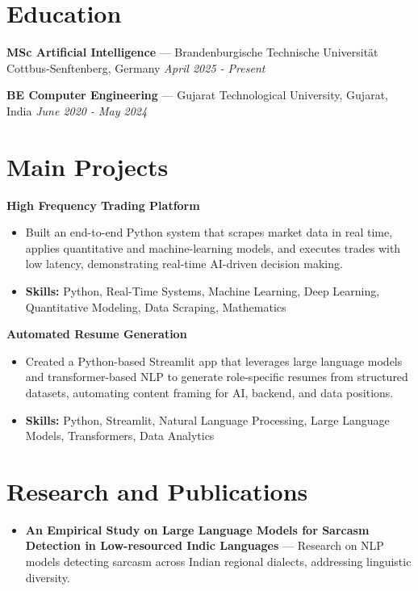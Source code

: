 \documentclass[a4paper,10pt]{article}
\begin{document}
\section*{Education}
\textbf{MSc Artificial Intelligence} — Brandenburgische Technische Universität Cottbus-Senftenberg, Germany \hfill \textit{April 2025 - Present}\par
\vspace{1.5pt}
\textbf{BE Computer Engineering} — Gujarat Technological University, Gujarat, India \hfill \textit{June 2020 - May 2024}\par

\section*{Main Projects}
\textbf{High Frequency Trading Platform}\par
\vspace{1pt}
\begin{itemize}
  \item Built an end-to-end Python system that scrapes market data in real time, applies quantitative and machine-learning models, and executes trades with low latency, demonstrating real-time AI-driven decision making.
  \item \textbf{Skills:} Python, Real-Time Systems, Machine Learning, Deep Learning, Quantitative Modeling, Data Scraping, Mathematics
\end{itemize}
\vspace{3pt}
\textbf{Automated Resume Generation}\par
\vspace{1pt}
\begin{itemize}
  \item Created a Python-based Streamlit app that leverages large language models and transformer-based NLP to generate role-specific resumes from structured datasets, automating content framing for AI, backend, and data positions.
  \item \textbf{Skills:} Python, Streamlit, Natural Language Processing, Large Language Models, Transformers, Data Analytics
\end{itemize}

\section*{Research and Publications}
\begin{itemize}
\item \textbf{An Empirical Study on Large Language Models for Sarcasm Detection in Low-resourced Indic Languages} — Research on NLP models detecting sarcasm across Indian regional dialects, addressing linguistic diversity.
\end{itemize}
\end{document}

